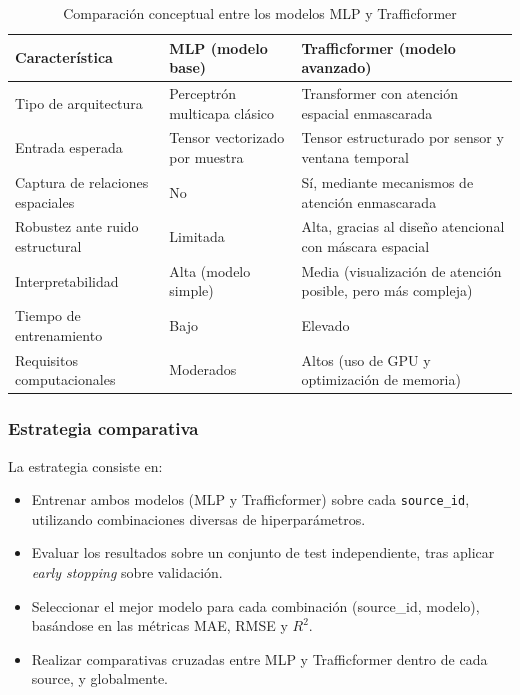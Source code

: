 \begin{table}[H]
	\centering
	\caption{Comparación conceptual entre los modelos MLP y Trafficformer}
	\label{tab:mlp_vs_trafficformer}
	\begin{tabularx}{\textwidth}{lXX}
		\toprule
		\textbf{Característica} & \textbf{MLP (modelo base)} & \textbf{Trafficformer (modelo avanzado)} \\
		\midrule
		Tipo de arquitectura & Perceptrón multicapa clásico & Transformer con atención espacial enmascarada \\
		Entrada esperada & Tensor vectorizado por muestra & Tensor estructurado por sensor y ventana temporal \\
		Captura de relaciones espaciales & No & Sí, mediante mecanismos de atención enmascarada \\
		Robustez ante ruido estructural & Limitada & Alta, gracias al diseño atencional con máscara espacial \\
		Interpretabilidad & Alta (modelo simple) & Media (visualización de atención posible, pero más compleja) \\
		Tiempo de entrenamiento & Bajo & Elevado \\
		Requisitos computacionales & Moderados & Altos (uso de GPU y optimización de memoria) \\
		\bottomrule
	\end{tabularx}
\end{table}

\subsubsection*{Estrategia comparativa}

La estrategia consiste en:

\begin{itemize}
	\item Entrenar ambos modelos (MLP y Trafficformer) sobre cada \texttt{source\_id}, utilizando combinaciones diversas de hiperparámetros.
	\item Evaluar los resultados sobre un conjunto de test independiente, tras aplicar \textit{early stopping} sobre validación.
	\item Seleccionar el mejor modelo para cada combinación (source\_id, modelo), basándose en las métricas MAE, RMSE y $R^2$.
	\item Realizar comparativas cruzadas entre MLP y Trafficformer dentro de cada source, y globalmente.
\end{itemize}


